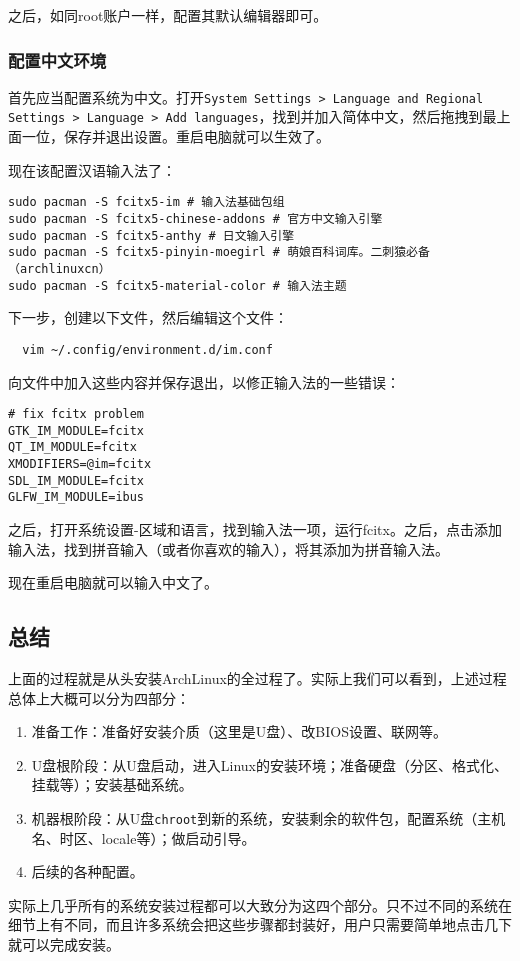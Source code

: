 \documentclass[../main.tex]{subfiles}
\begin{document}
之后，如同root账户一样，配置其默认编辑器即可。

\subsubsection{配置中文环境}

首先应当配置系统为中文。打开\texttt{System Settings > Language and Regional Settings > Language > Add languages}，找到并加入简体中文，然后拖拽到最上面一位，保存并退出设置。重启电脑就可以生效了。

现在该配置汉语输入法了：
\begin{lstlisting}
sudo pacman -S fcitx5-im # 输入法基础包组
sudo pacman -S fcitx5-chinese-addons # 官方中文输入引擎
sudo pacman -S fcitx5-anthy # 日文输入引擎
sudo pacman -S fcitx5-pinyin-moegirl # 萌娘百科词库。二刺猿必备（archlinuxcn）
sudo pacman -S fcitx5-material-color # 输入法主题
\end{lstlisting}
下一步，创建以下文件，然后编辑这个文件：
\begin{lstlisting}
  vim ~/.config/environment.d/im.conf
\end{lstlisting}
向文件中加入这些内容并保存退出，以修正输入法的一些错误：
\begin{lstlisting}
# fix fcitx problem
GTK_IM_MODULE=fcitx
QT_IM_MODULE=fcitx
XMODIFIERS=@im=fcitx
SDL_IM_MODULE=fcitx
GLFW_IM_MODULE=ibus
\end{lstlisting}
之后，打开系统设置-区域和语言，找到输入法一项，运行fcitx。之后，点击添加输入法，找到拼音输入（或者你喜欢的输入），将其添加为拼音输入法。

现在重启电脑就可以输入中文了。

\subsection{总结}

上面的过程就是从头安装ArchLinux的全过程了。实际上我们可以看到，上述过程总体上大概可以分为四部分：
\begin{enumerate}
  \item 准备工作：准备好安装介质（这里是U盘）、改BIOS设置、联网等。
  \item U盘根阶段：从U盘启动，进入Linux的安装环境；准备硬盘（分区、格式化、挂载等）；安装基础系统。
  \item 机器根阶段：从U盘\texttt{chroot}到新的系统，安装剩余的软件包，配置系统（主机名、时区、locale等）；做启动引导。
  \item 后续的各种配置。
\end{enumerate}
实际上几乎所有的系统安装过程都可以大致分为这四个部分。只不过不同的系统在细节上有不同，而且许多系统会把这些步骤都封装好，用户只需要简单地点击几下就可以完成安装。
\end{document}
